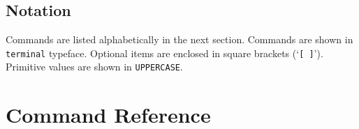 \documentclass[11pt]{book}
\newcommand{\phyg}{\texttt{PhyG} }
\begin{document}
{{	\subsection{Notation}
		Commands are listed alphabetically in the next section. Commands are shown in 
		\texttt{terminal} typeface. Optional items are enclosed in square brackets (`\texttt{[ ]}').
		Primitive values are shown in \texttt{UPPERCASE}. 
	


\section{Command Reference}
	

%
%	

}}
\end{document}
